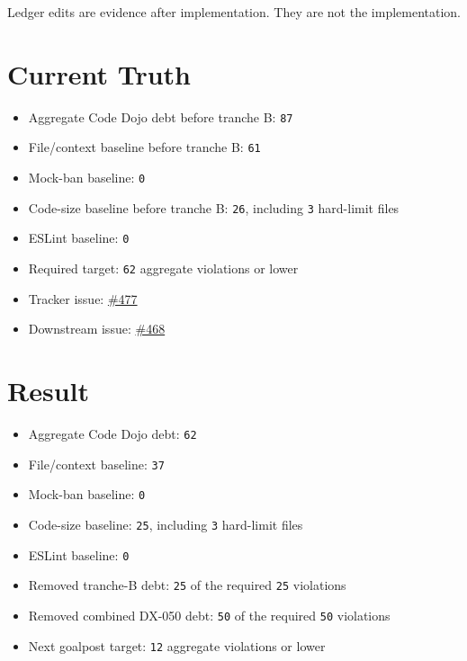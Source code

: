 Ledger edits are evidence after implementation. They are not the implementation.

\section{Current Truth}\label{record-246-current-truth}

\begin{itemize}
\tightlist
\item
  Aggregate Code Dojo debt before tranche B: \texttt{8\allowbreak{}7}
\item
  File/context baseline before tranche B: \texttt{6\allowbreak{}1}
\item
  Mock-ban baseline: \texttt{0}
\item
  Code-size baseline before tranche B: \texttt{2\allowbreak{}6}, including \texttt{3} hard-limit files
\item
  ESLint baseline: \texttt{0}
\item
  Required target: \texttt{6\allowbreak{}2} aggregate violations or lower
\item
  Tracker issue: \href{https://github.com/flyingrobots/bijou/issues/477}{\#477}
\item
  Downstream issue: \href{https://github.com/flyingrobots/bijou/issues/468}{\#468}
\end{itemize}

\section{Result}\label{record-246-result}

\begin{itemize}
\tightlist
\item
  Aggregate Code Dojo debt: \texttt{6\allowbreak{}2}
\item
  File/context baseline: \texttt{3\allowbreak{}7}
\item
  Mock-ban baseline: \texttt{0}
\item
  Code-size baseline: \texttt{2\allowbreak{}5}, including \texttt{3} hard-limit files
\item
  ESLint baseline: \texttt{0}
\item
  Removed tranche-B debt: \texttt{2\allowbreak{}5} of the required \texttt{2\allowbreak{}5} violations
\item
  Removed combined DX-050 debt: \texttt{5\allowbreak{}0} of the required \texttt{5\allowbreak{}0} violations
\item
  Next goalpost target: \texttt{1\allowbreak{}2} aggregate violations or lower
\end{itemize}


